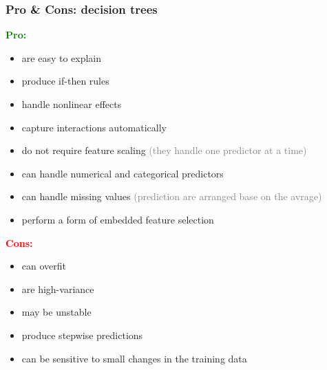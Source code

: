 \subsubsection{Pro \& Cons: decision trees}
\begin{minipage}[t]{0.45\textwidth}
\textcolor{green}{\textbf{Pro:}}
\begin{itemize}
    \item are easy to explain
    \item produce if-then rules
    \item handle nonlinear effects
    \item capture interactions automatically
    \item do not require feature scaling \textcolor{gray}{(they handle one predictor at a time)}
    \item can handle numerical and categorical predictors
    \item can handle missing values \textcolor{gray}{(prediction are arranged base on the avrage)}
    \item perform a form of embedded feature selection
\end{itemize}
\end{minipage}
\begin{minipage}[t]{0.45\textwidth}
\textcolor{red}{\textbf{Cons:}}
\begin{itemize}
    \item can overfit
    \item are high-variance
    \item may be unstable
    \item produce stepwise predictions
    \item can be sensitive to small changes in the training data
\end{itemize}
\end{minipage}